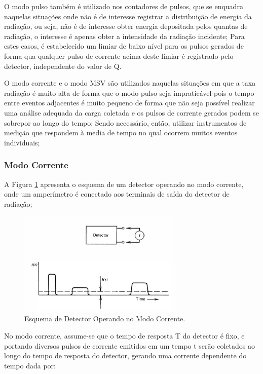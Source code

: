 \documentclass[11pt,a4paper]{article}
\begin{document}
		O \textcolor{CarnationPink}{modo pulso} também é utilizado nos \textcolor{CarnationPink}{contadores de pulsos}, que se enquadra naquelas situações onde não é de interesse registrar a distribuição de energia da radiação, ou seja, não é de interesse obter energia depositada pelos quantas de radiação, o interesse é apenas obter a intensidade da radiação incidente; Para estes casos, é estabelecido um limiar de baixo nível para os pulsos gerados de forma qua qualquer pulso de corrente acima deste limiar é registrado pelo detector, independente do valor de Q.

		O \textcolor{CarnationPink}{modo corrente} e o \textcolor{CarnationPink}{modo MSV} são utilizados naquelas situações em que a taxa radiação é muito alta de forma que o modo pulso seja impraticável pois o tempo entre eventos adjacentes é muito pequeno de forma que não seja possível realizar uma análise adequada da carga coletada e os pulsos de corrente gerados podem se sobrepor ao longo do tempo; Sendo necessário, então, utilizar instrumentos de medição que respondem à media de tempo no qual ocorrem muitos eventos individuais;

		\subsubsection{Modo Corrente}

			A Figura \ref{fig:esquemaModoCorrente} apresenta o esquema de um detector operando no modo corrente, onde um amperímetro é conectado aos terminais de saída do detector de radiação;

				\begin{figure}[h]
					\centering
					\includegraphics[width=0.7\textwidth]{Imagens/esquemaModoCorrente.jpg}
					\caption{Esquema de Detector Operando no Modo Corrente.}
					\label{fig:esquemaModoCorrente}
				\end{figure}
			
			No modo corrente, assume-se que o tempo de resposta T do detector é fixo, e portando diversos pulsos de corrente emitidos em um tempo t serão coletados ao longo do tempo de resposta do detector, gerando uma corrente dependente do tempo dada por:
			
\end{document}
